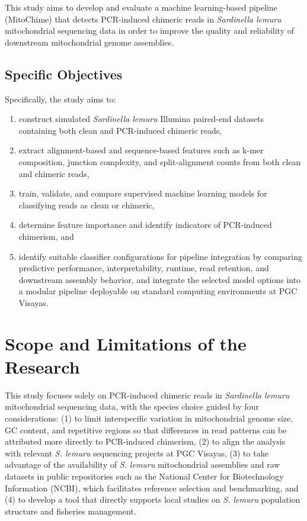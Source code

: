 This study aims to develop and evaluate a machine learning-based pipeline (MitoChime) that detects PCR-induced chimeric reads in \textit{Sardinella lemuru} mitochondrial sequencing data in order to improve the quality and reliability of downstream mitochondrial genome assemblies.

\subsection{Specific Objectives}\label{subsec:specificobjectives}

Specifically, the study aims to:
\begin{enumerate}
 \item construct simulated \textit{Sardinella lemuru} Illumina paired-end datasets containing both clean and PCR-induced chimeric reads,
 \item extract alignment-based and sequence-based features such as k-mer composition, junction complexity, and split-alignment counts from both clean and chimeric reads,
 \item train, validate, and compare supervised machine learning models for classifying reads as clean or chimeric,
 \item determine feature importance and identify indicators of PCR-induced chimerism, and
 \item identify suitable classifier configurations for pipeline integration by comparing predictive performance, interpretability, runtime, read retention, and downstream assembly behavior, and integrate the selected model options into a modular pipeline deployable on standard computing environments at PGC Visayas.
\end{enumerate}

\section{Scope and Limitations of the Research}\label{sec:scopelimitations}

This study focuses solely on PCR-induced chimeric reads in \textit{Sardinella lemuru} mitochondrial sequencing data, with the species choice guided by four considerations: (1) to limit interspecific variation in mitochondrial genome size, GC content, and repetitive regions so that differences in read patterns can be attributed more directly to PCR-induced chimerism, (2) to align the analysis with relevant \textit{S. lemuru} sequencing projects at PGC Visayas, (3) to take advantage of the availability of \textit{S. lemuru} mitochondrial assemblies and raw datasets in public repositories such as the National Center for Biotechnology Information (NCBI), which facilitates reference selection and benchmarking, and (4) to develop a tool that directly supports local studies on \textit{S. lemuru} population structure and fisheries management.

